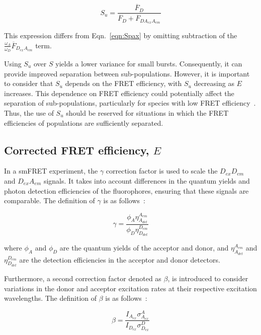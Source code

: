 \begin{equation}
\label{eqn:Su}
S_u = \frac{\overline{F}_{D}}{\overline{F}_{D}+\overline{F}_{DA_{ex}A_{em}}}
\end{equation}

\noindent
This expression differs from Eqn.~\ref{eqn:Spax} by omitting subtraction of the $\frac{\omega_A}{\omega_D} \overline{F}_{D_{ex}A_{em}}$ term.

Using $S_u$ over $S$ yields a lower variance for small bursts. 
Consequently, it can provide improved separation between sub-populations. 
However, it is important to consider that $S_u$ depends on the FRET efficiency, with $S_u$ decreasing as $E$ increases. 
This dependence on FRET efficiency could potentially affect the separation of sub-populations, particularly for species with low FRET efficiency~\cite{ingargiola_JCP_2018}.
Thus, the use of $S_u$ should be reserved for situations in which the FRET efficiencies of populations are sufficiently separated.

\subsection{Corrected FRET efficiency, $E$}
\label{sec:E_apdx}

In a \ac{smFRET} experiment, the $\gamma$ correction factor is used to scale the $D_{ex}D_{em}$ and $D_{ex}A_{em}$ signals. 
It takes into account differences in the quantum yields and photon detection efficiencies of the fluorophores, ensuring that these signals are comparable. 
The definition of $\gamma$ is as follows~\cite{lee_BPJ_2005}:

\begin{equation}
    \label{eqn:gamma}
    \gamma = \frac{\phi_A\eta^{A_{em}}_{A_{det}}}{\phi_D\eta^{D_{em}}_{D_{det}}}
\end{equation}

\noindent
where $\phi_A$ and $\phi_D$ are the quantum yields of the acceptor and donor, and $\eta^{A_{em}}_{A_{det}}$ and $\eta^{D_{em}}_{D_{det}}$ are the detection efficiencies in the acceptor and donor detectors. 

Furthermore, a second correction factor denoted as $\beta$, is introduced to consider variations in the donor and acceptor excitation rates at their respective excitation wavelengths. 
The definition of $\beta$ is as follows~\cite{lee_BPJ_2005}:

\begin{equation}
    \label{eqn:beta}
    \beta = \frac{I_{A_{ex}}\sigma^{A}_{A_{ex}}}{I_{D_{ex}}\sigma^{D}_{D_{ex}}}
\end{equation}

